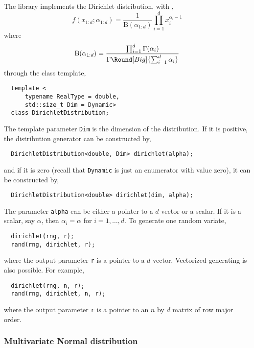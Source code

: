 The library implements the Dirichlet distribution, with \pdf,
\begin{equation*}
  f(x_{1:d};\alpha_{1:d}) = \frac{1}{\mathrm{B}(\alpha_{1:d})}
  \prod_{i=1}^d x_i^{\alpha_i - 1}
\end{equation*}
where
\begin{equation*}
  \mathrm{B}(\alpha_{1:d}) =
  \frac{\prod_{i=1}^d\Gamma(\alpha_i)}
  {\Gamma\Round[Big]{\sum_{i=1}^d\alpha_i}}
\end{equation*}
through the class template,
\begin{Verbatim}
  template <
      typename RealType = double,
      std::size_t Dim = Dynamic>
  class DirichletDistribution;
\end{Verbatim}
The template parameter \verb|Dim| is the dimension of the distribution. If it
is positive, the distribution generator can be constructed by,
\begin{Verbatim}
  DirichletDistribution<double, Dim> dirichlet(alpha);
\end{Verbatim}
and if it is zero (recall that \verb|Dynamic| is just an enumerator with value
zero), it can be constructed by,
\begin{Verbatim}
  DirichletDistribution<double> dirichlet(dim, alpha);
\end{Verbatim}
The parameter \verb|alpha| can be either a pointer to a $d$-vector or a scalar.
If it is a scalar, say $\alpha$, then $\alpha_i = \alpha$ for $i = 1,\dots,d$.
To generate one random variate,
\begin{Verbatim}
  dirichlet(rng, r);
  rand(rng, dirichlet, r);
\end{Verbatim}
where the output parameter \verb|r| is a pointer to a $d$-vector. Vectorized
generating is also possible. For example,
\begin{Verbatim}
  dirichlet(rng, n, r);
  rand(rng, dirichlet, n, r);
\end{Verbatim}
where the output parameter \verb|r| is a pointer to an $n$ by $d$ matrix of row
major order.

\subsubsection{Multivariate Normal distribution}

